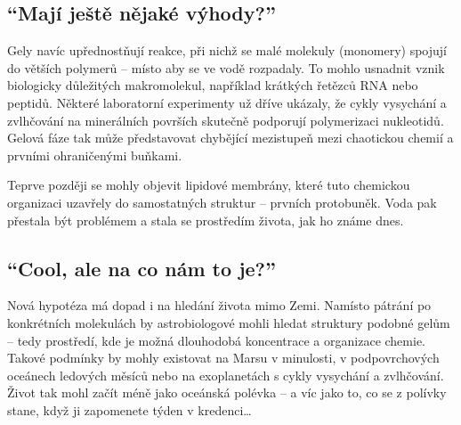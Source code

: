 \documentclass[main.tex]{subfiles}
\begin{document}
\subsection*{\enquote{Mají ještě nějaké výhody?}}
Gely navíc upřednostňují reakce, při nichž se malé molekuly (monomery) spojují do větších polymerů – místo aby se ve vodě rozpadaly. To mohlo usnadnit vznik biologicky důležitých makromolekul, například krátkých řetězců RNA nebo peptidů. Některé laboratorní experimenty už dříve ukázaly, že cykly vysychání a zvlhčování na minerálních površích skutečně podporují polymerizaci nukleotidů. Gelová fáze tak může představovat chybějící mezistupeň mezi chaotickou chemií a prvními ohraničenými buňkami.\par
Teprve později se mohly objevit lipidové membrány, které tuto chemickou organizaci uzavřely do samostatných struktur – prvních protobuněk. Voda pak přestala být problémem a stala se prostředím života, jak ho známe dnes.
\subsection*{\enquote{Cool, ale na co nám to je?}}
Nová hypotéza má dopad i na hledání života mimo Zemi. Namísto pátrání po konkrétních molekulách by astrobiologové mohli hledat struktury podobné gelům – tedy prostředí, kde je možná dlouhodobá koncentrace a organizace chemie. Takové podmínky by mohly existovat na Marsu v minulosti, v podpovrchových oceánech ledových měsíců nebo na exoplanetách s cykly vysychání a zvlhčování.
Život tak mohl začít méně jako oceánská polévka – a víc jako to, co se z polívky stane, když ji zapomenete týden v kredenci…
\newpage
\end{document}

